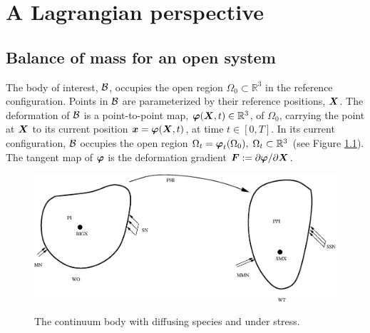 \chapter{A Lagrangian perspective}
\label{lagrangian-perspective} 

\section{Balance of mass for an open system}
\label{sect2} The body of interest, ${\mathcal B}$, occupies the open
region $\Omega_0\subset\mathbb{R}^3$ in the reference
configuration. Points in ${\mathcal B}$ are parameterized by their
reference positions, $\mbox{\boldmath$ X$}$. The deformation of ${\mathcal B}$ is a
point-to-point map, $\mbox{\boldmath$\varphi$} (\mbox{\boldmath$ X$},t)\in\mathbb{R}^3$, of
$\Omega_0$, carrying the point at $\mbox{\boldmath$ X$}$ to its current position
$\mbox{\boldmath$ x$} = \mbox{\boldmath$\varphi$}(\mbox{\boldmath$ X$},t)$, at time $t\in [0,T]$. In its current
configuration, ${\mathcal B}$ occupies the open region $\Omega_t =
\mbox{\boldmath$\varphi$}_t(\Omega_0),\; \Omega_t\subset\mathbb{R}^3$ (see Figure
\ref{potato}). The tangent map of $\mbox{\boldmath$\varphi$}$ is the deformation
gradient $\mbox{\boldmath$ F$} :=
\partial\mbox{\boldmath$\varphi$}/\partial\mbox{\boldmath$ X$}$.
\begin{figure}[ht]
\centering{} 
 
 
{\includegraphics[width=14cm]{images/growth1.eps}} \caption{The continuum
body with diffusing species and under stress.}\label{potato}
\end{figure}

